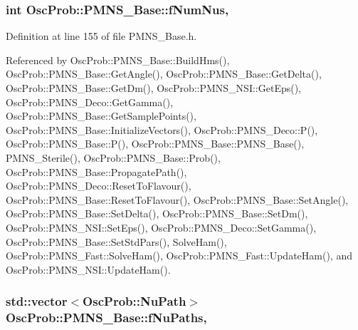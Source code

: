\subsubsection[{\texorpdfstring{f\+Num\+Nus}{fNumNus}}]{\setlength{\rightskip}{0pt plus 5cm}int Osc\+Prob\+::\+P\+M\+N\+S\+\_\+\+Base\+::f\+Num\+Nus\hspace{0.3cm}{\ttfamily [protected]}, {\ttfamily [inherited]}}\hypertarget{classOscProb_1_1PMNS__Base_a24bb74bed63569dfe88b18fa6a08060e}{}\label{classOscProb_1_1PMNS__Base_a24bb74bed63569dfe88b18fa6a08060e}


Definition at line 155 of file P\+M\+N\+S\+\_\+\+Base.\+h.



Referenced by Osc\+Prob\+::\+P\+M\+N\+S\+\_\+\+Base\+::\+Build\+Hms(), Osc\+Prob\+::\+P\+M\+N\+S\+\_\+\+Base\+::\+Get\+Angle(), Osc\+Prob\+::\+P\+M\+N\+S\+\_\+\+Base\+::\+Get\+Delta(), Osc\+Prob\+::\+P\+M\+N\+S\+\_\+\+Base\+::\+Get\+Dm(), Osc\+Prob\+::\+P\+M\+N\+S\+\_\+\+N\+S\+I\+::\+Get\+Eps(), Osc\+Prob\+::\+P\+M\+N\+S\+\_\+\+Deco\+::\+Get\+Gamma(), Osc\+Prob\+::\+P\+M\+N\+S\+\_\+\+Base\+::\+Get\+Sample\+Points(), Osc\+Prob\+::\+P\+M\+N\+S\+\_\+\+Base\+::\+Initialize\+Vectors(), Osc\+Prob\+::\+P\+M\+N\+S\+\_\+\+Deco\+::\+P(), Osc\+Prob\+::\+P\+M\+N\+S\+\_\+\+Base\+::\+P(), Osc\+Prob\+::\+P\+M\+N\+S\+\_\+\+Base\+::\+P\+M\+N\+S\+\_\+\+Base(), P\+M\+N\+S\+\_\+\+Sterile(), Osc\+Prob\+::\+P\+M\+N\+S\+\_\+\+Base\+::\+Prob(), Osc\+Prob\+::\+P\+M\+N\+S\+\_\+\+Base\+::\+Propagate\+Path(), Osc\+Prob\+::\+P\+M\+N\+S\+\_\+\+Deco\+::\+Reset\+To\+Flavour(), Osc\+Prob\+::\+P\+M\+N\+S\+\_\+\+Base\+::\+Reset\+To\+Flavour(), Osc\+Prob\+::\+P\+M\+N\+S\+\_\+\+Base\+::\+Set\+Angle(), Osc\+Prob\+::\+P\+M\+N\+S\+\_\+\+Base\+::\+Set\+Delta(), Osc\+Prob\+::\+P\+M\+N\+S\+\_\+\+Base\+::\+Set\+Dm(), Osc\+Prob\+::\+P\+M\+N\+S\+\_\+\+N\+S\+I\+::\+Set\+Eps(), Osc\+Prob\+::\+P\+M\+N\+S\+\_\+\+Deco\+::\+Set\+Gamma(), Osc\+Prob\+::\+P\+M\+N\+S\+\_\+\+Base\+::\+Set\+Std\+Pars(), Solve\+Ham(), Osc\+Prob\+::\+P\+M\+N\+S\+\_\+\+Fast\+::\+Solve\+Ham(), Osc\+Prob\+::\+P\+M\+N\+S\+\_\+\+Fast\+::\+Update\+Ham(), and Osc\+Prob\+::\+P\+M\+N\+S\+\_\+\+N\+S\+I\+::\+Update\+Ham().

\subsubsection[{\texorpdfstring{f\+Nu\+Paths}{fNuPaths}}]{\setlength{\rightskip}{0pt plus 5cm}std\+::vector$<${\bf Osc\+Prob\+::\+Nu\+Path}$>$ Osc\+Prob\+::\+P\+M\+N\+S\+\_\+\+Base\+::f\+Nu\+Paths\hspace{0.3cm}{\ttfamily [protected]}, {\ttfamily [inherited]}}\hypertarget{classOscProb_1_1PMNS__Base_a69db9d57e12fc7cbe0431bc6c18fac93}{}\label{classOscProb_1_1PMNS__Base_a69db9d57e12fc7cbe0431bc6c18fac93}


